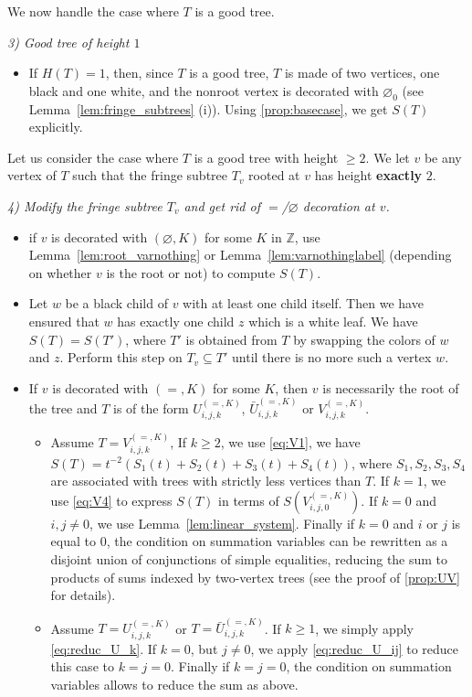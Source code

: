 \documentclass[12pt]{amsart}
\theoremstyle{plain}
\theoremstyle{remark}
\begin{document}
We now handle the case where $T$ is a good tree.

\emph{3) Good tree of height $1$}

\begin{itemize}
\item If $H(T)=1$, then, since $T$ is a good tree, $T$ is made of two vertices, one black and one white, and the nonroot vertex is decorated with $\varnothing_0$ (see Lemma~\ref{lem:fringe_subtrees} (i)). Using  \cref{prop:basecase}, we get $S(T)$ explicitly.
\end{itemize}

Let us consider the case where $T$ is a good tree with height $\geq 2$. We let $v$ be any vertex of $T$ such that the fringe subtree $T_v$ rooted at $v$ has height \textbf{exactly} $2$.

\emph{4) Modify the fringe subtree $T_v$ and get rid of $=$/$\varnothing$ decoration at $v$.}
\begin{itemize}
\item[4(a)] if $v$ is decorated with $(\varnothing,K)$ for some $K$ in $\mathbb Z$,
use Lemma~\ref{lem:root_varnothing} or Lemma~\ref{lem:varnothinglabel} 
(depending on whether $v$ is the root or not) to compute $S(T)$.
\item[4(b)] Let $w$ be a black child of $v$ with at least one child itself. Then we have ensured that $w$ has exactly one child $z$ which is a white leaf. We have $S(T)=S(T')$, where $T'$ is obtained from $T$ by swapping the colors of $w$ and $z$. 
Perform this step on $T_v \subseteq T'$ until there is no more such a vertex $w$.
\item[4(c)] If $v$ is decorated with $(=,K)$ for some $K$, then $v$ is necessarily the root of the tree and $T$ is of the form $U_{i,j,k}^{(=,K)}$, $\bar U_{i,j,k}^{(=,K)}$ or $V_{i,j,k}^{(=,K)}$. 
  \begin{itemize}
    \item[4(c)1.] Assume $T=V_{i,j,k}^{(=,K)}$, 
      If $k \ge 2$, we use \eqref{eq:V1}, we have $S(T)=t^{-2}(S_1(t)+S_2(t)+S_3(t)+S_4(t))$, where $S_1,S_2,S_3,S_4$ are associated with trees with strictly less vertices than $T$. If $k=1$, we use \eqref{eq:V4} to express $S(T)$ in terms of $S(V_{i,j,0}^{(=,K)})$. If $k=0$ and $i,j \ne 0$, we use Lemma~\ref{lem:linear_system}. Finally if $k=0$ and $i$ or $j$ is equal to $0$, the condition on summation variables can be rewritten as a disjoint union of conjunctions of simple equalities, reducing the sum to products of sums indexed by two-vertex trees (see the proof of \cref{prop:UV} for details).
    \item[4(c)2.] Assume $T=U_{i,j,k}^{(=,K)}$ or $T=\bar U_{i,j,k}^{(=,K)}$. If $k \ge 1$, we simply apply \eqref{eq:reduc_U_k}. If $k=0$, but $j \ne 0$, we apply \eqref{eq:reduc_U_ij} to reduce this case to $k=j=0$. Finally if $k=j=0$, the condition on summation variables allows to reduce the sum as above.
  \end{itemize}
\end{itemize}
\end{document}
